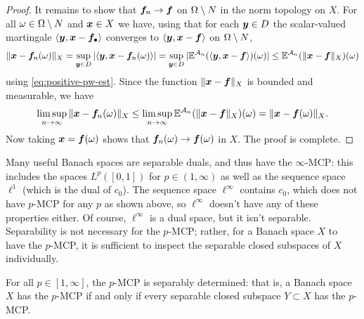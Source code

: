 \begin{proof}
  It remains to show that $\bm{f}_n \to \bm{f}$ on $\Omega \setminus N$ in the norm topology on $X$.
  For all $\omega \in \Omega \setminus N$ and $\bm{x} \in X$ we have, using that for each $\bm{y} \in D$ the scalar-valued martingale $\langle \bm{y}, \bm{x} - \bm{f}_\bullet \rangle$ converges to $\langle \bm{y}, \bm{x} - \bm{f}\rangle$ on $\Omega \setminus N$, 
  \begin{equation*}
    \|\bm{x} - \bm{f}_n(\omega)\|_{X}
    = \sup_{\bm{y} \in D} |\langle \bm{y}, \bm{x} - \bm{f}_n(\omega) \rangle| 
    = \sup_{\bm{y} \in D} |\mathbb{E}^{\mathcal{A}_n} (\langle \bm{y}, \bm{x} - \bm{f} \rangle)(\omega) | 
    \leq \mathbb{E}^{\mathcal{A}_n}( \|\bm{x} - \bm{f}\|_{X})(\omega)
  \end{equation*}
  using \eqref{eq:positive-pw-est}.
  Since the function $\|\bm{x} - \bm{f}\|_{X}$ is bounded and measurable, we have
  \begin{equation*}
    \limsup_{n \to \infty} \|\bm{x} - \bm{f}_n(\omega)\|_{X} \leq \limsup_{n \to \infty} \mathbb{E}^{\mathcal{A}_n}( \|\bm{x} - \bm{f}\|_{X})(\omega) = \|\bm{x} - \bm{f}(\omega)\|_{X}.
  \end{equation*}
  Now taking $\bm{x} = \bm{f}(\omega)$ shows that $\bm{f}_n(\omega) \to \bm{f}(\omega)$ in $X$.
  The proof is complete.  
\end{proof}

Many useful Banach spaces are separable duals, and thus have the $\infty$-MCP: this includes the spaces $L^p([0,1])$ for $p \in (1,\infty)$ as well as the sequence space $\ell^1$ (which is the dual of $c_0$).
The sequence space $\ell^\infty$ contains $c_0$, which does not have $p$-MCP for any $p$ as shown above, so $\ell^\infty$ doesn't have any of these properties either.
Of course, $\ell^\infty$ is a dual space, but it isn't separable.
Separability is not necessary for the $p$-MCP; rather, for a Banach space $X$ to have the $p$-MCP, it is sufficient to inspect the separable closed subspaces of $X$ individually.

\begin{lem}\label{lem:MCP-sepdet}
  For all $p \in [1,\infty]$, the $p$-MCP is separably determined: that is, a Banach space $X$ has the $p$-MCP if and only if every separable closed subspace $Y \subset X$ has the $p$-MCP.
\end{lem}

